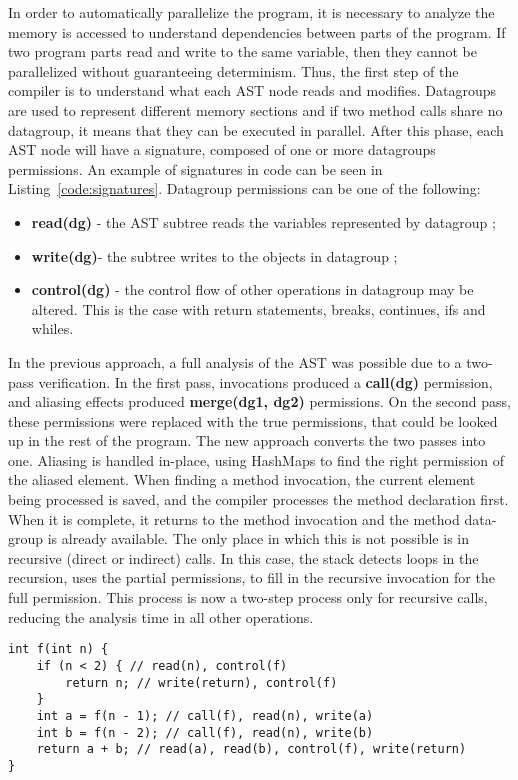 \documentclass[smallextended]{svjour3}
\begin{document}
In order to automatically parallelize the program, it is necessary to analyze the memory is accessed to understand dependencies between parts of the program. If two program parts read and write to the same variable, then they cannot be parallelized without guaranteeing determinism. Thus, the first step of the compiler is to understand what each AST node reads and modifies. Datagroups\cite{leino2002using} are used to represent different memory sections and if two method calls share no datagroup, it means that they can be executed in parallel. After this phase, each AST node will have a signature, composed of one or more datagroups permissions. An example of signatures in code can be seen in Listing~\ref{code:signatures}. Datagroup permissions can be one of the following: 

\begin{itemize}
	\item \textbf{read(dg)} - the AST subtree reads the variables represented by datagroup ;
	\item \textbf{write(dg)}- the subtree writes to the objects in datagroup ;
	\item \textbf{control(dg)} - the control flow of other operations in datagroup  may be altered. This is the case with return statements, breaks, continues, ifs and whiles.
\end{itemize}

In the previous approach, a full analysis of the AST was possible due to a two-pass verification. In the first pass, invocations produced a \textbf{call(dg)} permission, and aliasing effects produced \textbf{merge(dg1, dg2)} permissions. On the second pass, these permissions were replaced with the true permissions, that could be looked up in the rest of the program. The new approach converts the two passes into one. Aliasing is handled in-place, using HashMaps to find the right permission of the aliased element. When finding a method invocation, the current element being processed is saved, and the compiler processes the method declaration first. When it is complete, it returns to the method invocation and the method data-group is already available. The only place in which this is not possible is in recursive (direct or indirect) calls. In this case, the stack detects loops in the recursion, uses the partial permissions, to fill in the recursive invocation for the full permission. This process is now a two-step process only for recursive calls, reducing the analysis time in all other operations.


\begin{lstlisting}
int f(int n) {
    if (n < 2) { // read(n), control(f)
        return n; // write(return), control(f)
    }
    int a = f(n - 1); // call(f), read(n), write(a)
    int b = f(n - 2); // call(f), read(n), write(b)
    return a + b; // read(a), read(b), control(f), write(return)
}
\end{lstlisting}
\end{document}
